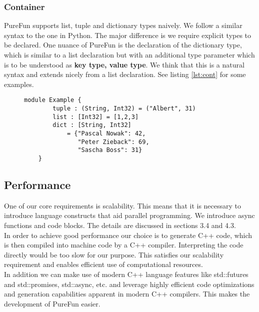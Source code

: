 \subsubsection{Container} PureFun supports list, tuple and dictionary types naively. We follow a similar syntax to the one in Python. The major difference is we require explicit types to be declared. One nuance of PureFun is the declaration of the dictionary type, which is similar to a list declaration but with an additional type parameter which is to be understood as \textbf{key type, value type}. We think that this is a natural syntax and extends nicely from a list declaration. See listing \ref{lst:cont} for some examples.

\begin{figure}
	\begin{lstlisting}[caption={Some examples of container types supported in PureFun.},label={lst:cont}]
	module Example {
		tuple : (String, Int32) = ("Albert", 31)
		list : [Int32] = [1,2,3]
		dict : [String, Int32] 
			= {"Pascal Nowak": 42,
			   "Peter Zieback": 69,
			   "Sascha Boss": 31}
	}
	\end{lstlisting}
\end{figure}

\subsection{Performance}
One of our core requirements is scalability. This means that it is necessary to introduce language constructs that aid parallel programming. We introduce async functions and code blocks. The details are discussed in sections 3.4 and 4.3.\\
In order to achieve good performance our choice is to generate C++ code, which is then compiled into machine code by a C++ compiler. Interpreting the code directly would be too slow for our purpose. This satisfies our scalability requirement and enables efficient use of computational resources.\\
In addition we can make use of modern C++ language features like std::futures and std::promises, std::async, etc. and leverage highly efficient code optimizations and generation capabilities apparent in modern C++ compilers. This makes the development of PureFun easier.
